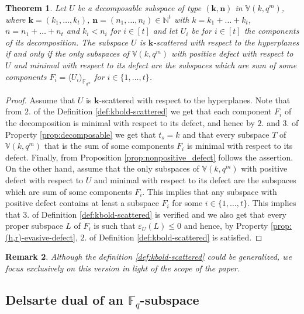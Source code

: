 \documentclass[11pt]{amsart}
\newtheorem{theorem}{Theorem}[section]
\newtheorem{remark}[theorem]{Remark}
\newcommand{\fqm}{\mathbb{F}_{q^m}}
\newcommand{\fq}{{\mathbb F}_{q}}
\begin{document}
\begin{theorem} \label{thm:caracK-scattered}
Let $U$ be a decomposable subspace of type $(\mathbf{k}, \mathbf{n})$ in $\mathbb{V}(k,q^m)$, where $\mathbf{k}=(k_1,\ldots,k_t)$, $\mathbf{n}=(n_1,\ldots,n_t)\in\mathbb N^t$ with $k=k_1+\ldots+k_t$, $n=n_1+\ldots+n_t$ and $k_i<n_i$ for $i\in [t]$ and let $U_i$ be for $i\in [t]$ the components of its decomposition.
   The subspace $U$ is $\mathbf{k}$-scattered with respect to the hyperplanes if and only if the only subspaces of $\mathbb{V}(k,q^m)$ with positive defect with respect to $U$ and minimal with respect to its defect are the subspaces which are  sum of some components $F_i=\langle U_i\rangle_{\fqm}$ for $i \in \{1,\ldots,t\}$.
\end{theorem}
\begin{proof}
   Assume that $U$ is $\mathbf{k}$-scattered with respect to the hyperplanes. Note that from $2.$ of the Definition \ref{def:kbold-scattered} we get that each component $F_i$ of the decomposition is minimal with respect to its defect, and hence by $2.$ and $3.$ of Property \ref{prop:decomposable} we get that  $t_s=k$ and that  every subspace $T$ of $\mathbb{V}(k,q^m)$ that is the sum of some components $F_i$  is minimal with respect to its defect. Finally, from Proposition \ref{prop:nonpositive_defect} follows the assertion.
   On the other hand, assume that the only subspaces of $\mathbb{V}(k,q^m)$ with positive defect with respect to $U$ and minimal with respect to its defect are the subspaces which are  sum of some components $F_i$. This implies that any subspace with positive defect contains at least a subspace $F_i$ for some $i \in \{1,\ldots,t\}$. This implies that  $3.$ of Definition \ref{def:kbold-scattered} is verified and  we also get that  every proper subspace $L$ of $F_i$ is such that $\varepsilon_U(L)\leq 0$ and hence, by Property \ref{prop:(h,r)-evasive-defect},  $2.$ of Definition \ref{def:kbold-scattered} is satisfied. 
\end{proof}


\begin{remark}
    Although the definition \ref{def:kbold-scattered} could be generalized, we focus exclusively on this version in light of the scope of the paper.
\end{remark}

\subsection{Delsarte dual of an $\fq$-subspace}
\end{document}
